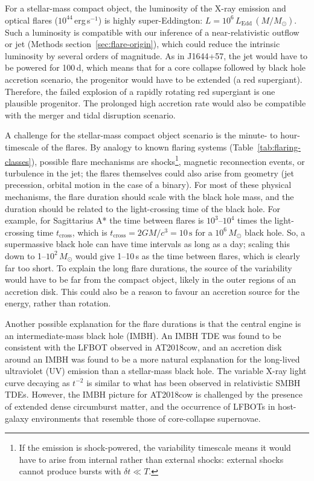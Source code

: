 \documentclass{nature_plusfigure}
\begin{document}
\begin{methods}
For a stellar-mass compact object, the luminosity of the X-ray emission and optical flares ($10^{44}\,$erg\,s$^{-1}$) is highly super-Eddington: $L=10^{6}\,L_\mathrm{Edd}\,(M/M_\odot)$. Such a luminosity is compatible with our inference of a near-relativistic outflow or jet (Methods section~\ref{sec:flare-origin}), which could reduce the intrinsic luminosity by several orders of magnitude. As in J1644+57, the jet would have to be powered for 100\,d, which means that for a core collapse followed by black hole accretion scenario\cite{Woosley1993,WoosleyHeger2012,Kashiyama2015}, the progenitor would have to be extended (a red supergiant\cite{Quataert2012}). Therefore, the failed explosion of a rapidly rotating red supergiant is one plausible progenitor. The prolonged high accretion rate would also be compatible with the merger and tidal disruption scenario\cite{Metzger2022}.

A challenge for the stellar-mass compact object scenario is the minute- to hour-timescale of the flares. By analogy to known flaring systems (Table~\ref{tab:flaring-classes}), possible flare mechanisms are shocks\footnote{If the emission is shock-powered, the variability timescale means it would have to arise from internal rather than external shocks: external shocks cannot\cite{Kumar2015} produce bursts with $\delta t\ll T$.
}, magnetic reconnection events, or turbulence in the jet; the flares themselves could also arise from geometry (jet precession, orbital motion in the case of a binary). For most of these physical mechanisms, the flare duration should scale with the black hole mass, and the duration should be related to the light-crossing time of the black hole. 
For example, for Sagittarius A* the time between flares is $10^{3}$--$10^{4}$ times the light-crossing time $t_\mathrm{cross}$, which is $t_\mathrm{cross}=2GM/c^3=10\,\mathrm{s}$ for a $10^6\,M_\odot$ black hole.
So, a supermassive black hole can have time intervals as long as a day; scaling this down to 1--$10^2\,M_\odot$ would give 1--10\,s as the time between flares, which is clearly far too short.
To explain the long flare durations, the source of the variability would have to be far from the compact object, likely in the outer regions of an accretion disk\cite{Metzger2022}. This could also be a reason to favour an accretion source for the energy, rather than rotation.

Another possible explanation for the flare durations is that the central engine is an intermediate-mass black hole (IMBH). An IMBH TDE was found to be consistent with the LFBOT observed in AT2018cow\cite{Kuin2019,Perley2019}, and an accretion disk around an IMBH was found to be a more natural explanation for the long-lived ultraviolet (UV) emission than a stellar-mass black hole\cite{Chen2023b}. The variable X-ray light curve decaying as $t^{-2}$ is similar to what has been observed in relativistic SMBH TDEs. However, the IMBH picture for AT2018cow is challenged\cite{Margutti2019,Metzger2022} by the presence of extended dense circumburst matter\cite{Ho2019,Nayana2021}, and the occurrence of LFBOTs in host-galaxy environments that resemble those of core-collapse supernovae\cite{Lyman2020}. 


\end{methods}
\end{document}
